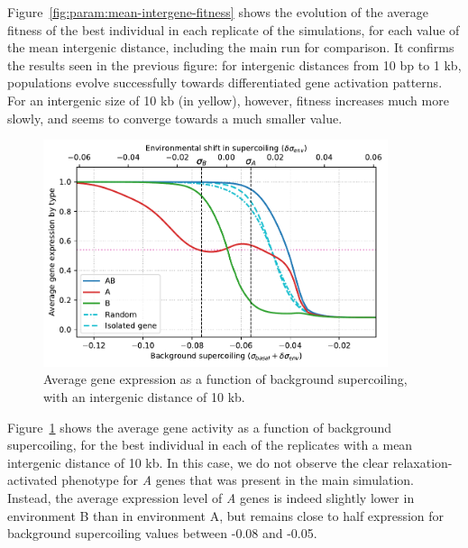 Figure~\ref{fig:param:mean-intergene-fitness} shows the evolution of the average fitness of the best individual in each replicate of the simulations, for each value of the mean intergenic distance, including the main run for comparison.
It confirms the results seen in the previous figure: for intergenic distances from 10 bp to 1 kb, populations evolve successfully towards differentiated gene activation patterns.
For an intergenic size of 10 kb (in yellow), however, fitness increases much more slowly, and seems to converge towards a much smaller value.

\begin{figure}[H]
\centering
\includegraphics[width=0.9\textwidth]{param/mean-intergene/inter-10k/activity_sigmas_avg.pdf}
\caption[Average gene expression as a function of background supercoiling, with an intergenic distance of 10 kb]{Average gene expression as a function of background supercoiling, with an intergenic distance of 10 kb.}
\label{fig:param:mean-intergene-10kb-activ-by-sigma}
\end{figure}

Figure~\ref{fig:param:mean-intergene-10kb-activ-by-sigma} shows the average gene activity as a function of background supercoiling, for the best individual in each of the replicates with a mean intergenic distance of 10 kb.
In this case, we do not observe the clear relaxation-activated phenotype for \emph{A} genes that was present in the main simulation.
Instead, the average expression level of \emph{A} genes is indeed slightly lower in environment B than in environment A, but remains close to half expression for background supercoiling values between -0.08 and -0.05.

